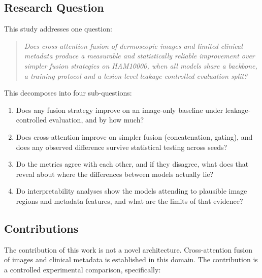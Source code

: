 \documentclass[conference]{IEEEtran}
\begin{document}
\subsection{Research Question}

This study addresses one question:

\begin{quote}
\textit{Does cross-attention fusion of dermoscopic images and limited clinical metadata produce a measurable and statistically reliable improvement over simpler fusion strategies on HAM10000, when all models share a backbone, a training protocol and a lesion-level leakage-controlled evaluation split?}
\end{quote}

This decomposes into four sub-questions:

\begin{enumerate}
\item[RQ1] Does any fusion strategy improve on an image-only baseline under leakage-controlled evaluation, and by how much?
\item[RQ2] Does cross-attention improve on simpler fusion (concatenation, gating), and does any observed difference survive statistical testing across seeds?
\item[RQ3] Do the metrics agree with each other, and if they disagree, what does that reveal about where the differences between models actually lie?
\item[RQ4] Do interpretability analyses show the models attending to plausible image regions and metadata features, and what are the limits of that evidence?
\end{enumerate}

\subsection{Contributions}

The contribution of this work is not a novel architecture. Cross-attention fusion of images and clinical metadata is established in this domain. The contribution is a controlled experimental comparison, specifically:
\end{document}
